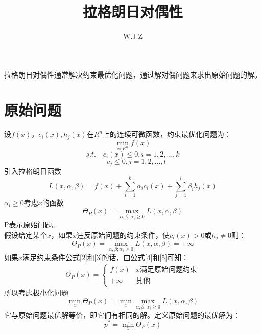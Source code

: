 \documentclass{article}
\title{拉格朗日对偶性}
\author{W.J.Z}
\date{}
\begin{document}
	\maketitle
	拉格朗日对偶性通常解决约束最优化问题，通过解对偶问题来求出原始问题的解。
	\section{原始问题}
	设$f(x)，c_{i}(x),h_{j}(x)在R^{n}$上的连续可微函数，约束最优化问题为：
	\begin{equation}
	\mathop{min}_{x\varepsilon R^{n}}f\left ( x \right )
	\end{equation}
	\begin{equation}
	s.t. \quad c_{i}(x)\leq 0, i =1,2,\ldots,k
	\label{2}
	\end{equation}
	\begin{equation}
	 \quad c_{j}\leq 0, j =1,2,\ldots,l
	 \label{3}
	\end{equation}
	引入拉格朗日函数
	\begin{equation}
	L\left ( x,\alpha ,\beta  \right )=f\left ( x \right )+\sum_{i=1}^{k}\alpha _{i}c_{i}\left ( x \right )+\sum_{j=1}^{l}\beta _{i}h_{j}\left ( x \right )
	\label{4}
	\end{equation}
	$\alpha_{i}\geq 0$考虑$x$的函数
	\begin{equation}
	\Theta _{P}(x)=\mathop{max}_{\alpha ,\beta ;\alpha _{i}\geq 0}L\left ( x,\alpha ,\beta  \right )
	\label{5}
	\end{equation}
	P表示原始问题。\\
	假设给定某个$x$，如果$x$违反原始问题的约束条件，使$c_{i}(x)>0$或$h_{j}\neq 0$则：
	\begin{equation}
	\Theta _{P}(x)=\mathop{max}_{\alpha ,\beta ;\alpha _{i}\geq 0}L\left ( x,\alpha ,\beta  \right )=+\infty 
	\end{equation}
	如果$x$满足约束条件公式\ref{2}和\ref{3}的话，由公式\ref{4}和\ref{5}可知：
	\begin{align*}
	\Theta _{P}\left ( x \right )=\begin{cases}
	f(x) & \text{$x$满足原始问题约束}\\
	+\infty & \text{其他}
	\end{cases}
	\end{align*}
	所以考虑极小化问题
	\begin{equation}
	\mathop{min}_{x}\Theta _{P}\left ( x \right )=\mathop{min}_{x}\mathop{max}_{\alpha ,\beta ;\alpha _{i}\geq 0}L\left ( x,\alpha ,\beta  \right )
	\end{equation}
	它与原始问题最优解等价，即它们有相同的解。定义原始问题的最优解为：
	\begin{equation}
	p^{\ast }=\mathop{min}_{x}\Theta _{P}\left ( x \right )
	\end{equation}
\end{document}
